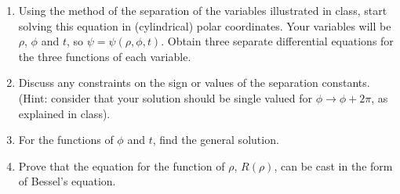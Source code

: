 \documentclass[fleqn]{article}
\begin{document}
  \begin{enumerate}
    \item Using the method of the separation of the variables illustrated in class, start solving this equation in (cylindrical) polar coordinates. Your variables will be $\rho$, $\phi$ and $t$, so $\psi=\psi(\rho, 
    \phi, t)$.  Obtain  three separate differential equations for the three functions of each variable. 

    \item Discuss any constraints on the sign or values of the separation constants. (Hint: consider that your solution should be single valued for $\phi \rightarrow \phi+ 2\pi$, as explained in class). 

    \item For the functions of $\phi$ and $t$, find the general solution. 

    \item Prove that the equation for the function of $\rho$, $R(\rho)$, can be cast in the form of Bessel's equation.  
  \end{enumerate}
\end{document}
